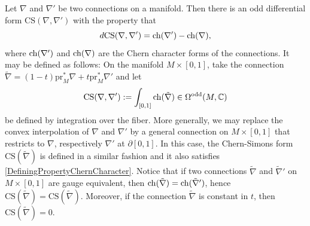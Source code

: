 \documentclass[10pt]{amsart}
\begin{document}
Let $\nabla$ and $\nabla'$ be two connections on a manifold. Then there is an odd differential form $\mathrm{CS}(\nabla, \nabla')$ with the property that
\begin{equation}
\label{DefiningPropertyChernCharacter}
d \mathrm{CS}(\nabla, \nabla') = \mathrm{ch}(\nabla') - \mathrm{ch}(\nabla),
\end{equation}
where $\mathrm{ch}(\nabla')$ and $\mathrm{ch}(\nabla)$ are the Chern character forms of the connections. It may be defined as follows: On the manifold $M \times [0, 1]$, take the connection $\tilde{\nabla} = (1-t)\mathrm{pr}_M^*\nabla + t\mathrm{pr}_M^*\nabla'$ and let
\[
\mathrm{CS}(\nabla, \nabla') := \int_{[0, 1]}\mathrm{ch}(\tilde{\nabla}) \in \Omega^{\mathrm{odd}}(M, \mathbb{C}) 
\]
be defined by integration over the fiber. More generally, we may replace the convex interpolation of $\nabla$ and $\nabla'$ by a general connection on $M \times [0, 1]$ that restricts to $\nabla$, respectively $\nabla'$ at $\partial [0, 1]$. In this case, the Chern-Simons form $\mathrm{CS}(\tilde{\nabla})$ is defined in a similar fashion and it also satisfies \cref{DefiningPropertyChernCharacter}. Notice that if two connections $\tilde{\nabla}$ and $\tilde{\nabla}'$ on $M \times [0, 1]$ are gauge equivalent, then $\mathrm{ch}(\tilde{\nabla}) = \mathrm{ch}(\tilde{\nabla}')$, hence $\mathrm{CS}(\tilde{\nabla}) = \mathrm{CS}(\tilde{\nabla})$. Moreover, if the connection $\tilde{\nabla}$ is constant in $t$, then $\mathrm{CS}(\tilde{\nabla}) = 0$.


\end{document}
